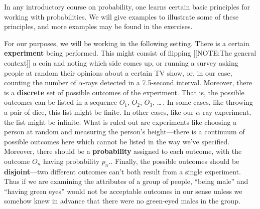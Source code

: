 In any introductory course on probability, one learns certain basic
principles for working with probabilities.  We will give examples to
illustrate some of these principles, and more examples may be found in
the exercises.

For our purposes, we will be working in the following setting.  There
is a certain {\bf experiment} being performed.  This might consist of
flipping
[[NOTE:The general context]]
a coin and noting which side comes up, or running a survey asking
people at random their opinions about a certain TV show, or, in our
case, counting the number of $\alpha$-rays detected in a 7.5-second
interval.  Moreover, there is a {\bf discrete} set of possible
outcomes of the experiment.  That is, the possible outcomes can be
listed in a sequence $O_1$, $O_2$, $O_3$, \ldots\,.  In some cases,
like throwing a pair of dice, this list might be finite.  In other
cases, like our $\alpha$-ray experiment, the list might be infinite.
What is ruled out are experiments like choosing a person at random and
measuring the person's height---there is a continuum of possible
outcomes here which cannot be listed in the way we've specified.
Moreover, there should be a {\bf probability} assigned to each
outcome, with the outcome $O_n$ having probability $p_n$..  Finally,
the possible outcomes should be {\bf disjoint}---two different
outcomes can't both result from a single experiment.  Thus if we are
examining the attributes of a group of people, ``being male'' and
``having green eyes'' would not be acceptable outcomes in our sense
unless we somehow knew in advance that there were no green-eyed males
in the group.

